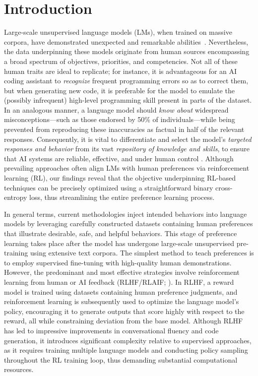 \section{Introduction}
Large-scale unsupervised language models (LMs), when trained on massive corpora, have demonstrated unexpected and remarkable abilities~\citep{chowdhery2022palm, brown2020language, touvron2023llama,bubeck2023sparks}. Nevertheless, the data underpinning these models originate from human sources encompassing a broad spectrum of objectives, priorities, and competencies. Not all of these human traits are ideal to replicate; for instance, it is advantageous for an AI coding assistant to \textit{recognize} frequent programming errors so as to correct them, but when generating new code, it is preferable for the model to emulate the (possibly infrequent) high-level programming skill present in parts of the dataset. In an analogous manner, a language model should \textit{know about} widespread misconceptions—such as those endorsed by 50\% of individuals—while being prevented from reproducing these inaccuracies as factual in half of the relevant responses. Consequently, it is vital to differentiate and select the model's \emph{targeted responses and behavior} from its vast \textit{repository of knowledge and skills}, to ensure that AI systems are reliable, effective, and under human control \citep{ouyang2022training}. Although prevailing approaches often align LMs with human preferences via reinforcement learning (RL), our findings reveal that the objective underpinning RL-based techniques can be precisely optimized using a straightforward binary cross-entropy loss, thus streamlining the entire preference learning process.

In general terms, current methodologies inject intended behaviors into language models by leveraging carefully constructed datasets containing human preferences that illustrate desirable, safe, and helpful behaviors. This stage of preference learning takes place after the model has undergone large-scale unsupervised pre-training using extensive text corpora. The simplest method to teach preferences is to employ supervised fine-tuning with high-quality human demonstrations. However, the predominant and most effective strategies involve reinforcement learning from human or AI feedback (RLHF/RLAIF; \citep{christiano2017deep,bai2022constitutional}). In RLHF, a reward model is trained using datasets containing human preference judgments, and reinforcement learning is subsequently used to optimize the language model's policy, encouraging it to generate outputs that score highly with respect to the reward, all while constraining deviation from the base model. Although RLHF has led to impressive improvements in conversational fluency and code generation, it introduces significant complexity relative to supervised approaches, as it requires training multiple language models and conducting policy sampling throughout the RL training loop, thus demanding substantial computational resources.


